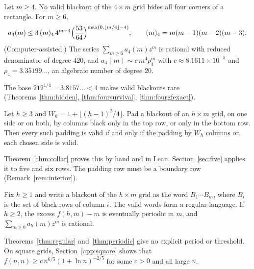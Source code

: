 \begin{introthm}\label{thm:C}
Let $m\ge4$. No valid blackout of the $4\times m$ grid hides all four corners of a
rectangle. For $m\ge6$,
\[
a_4(m)\le3\,(m)_4\,4^{m-4}\Bigl(\frac{53}{64}\Bigr)^{\max(0,\lfloor m/4\rfloor-4)},
\qquad (m)_4=m(m-1)(m-2)(m-3).
\]
(Computer-assisted.) The series $\sum_{m\ge6}a_4(m)z^m$ is rational with reduced
denominator of degree $420$, and $a_4(m)\sim c\,m^4\rho_4^m$ with $c\approx8.1611\times10^{-5}$
and $\rho_4=3.35199\ldots$, an algebraic number of degree $20$.
\end{introthm}

The base $212^{1/4}=3.8157\ldots<4$ makes valid blackouts rare (Theorems~\ref{thm:hidden},
\ref{thm:foursurvival}, \ref{thm:fourgfexact}).

\begin{introthm}\label{thm:D}
Let $h\ge3$ and $W_h=1+\lfloor(h-1)^2/4\rfloor$. Pad a blackout of an $h\times m$ grid, on
one side or on both, by columns black only in the top row, or only in the bottom row.
Then every such padding is valid if and only if the padding by $W_h$ columns on each
chosen side is valid.
\end{introthm}

Theorem~\ref{thm:collar} proves this by hand and in Lean. Section~\ref{sec:five} applies it
to five and six rows. The padding row must be a boundary row (Remark~\ref{rem:interior}).

\begin{introthm}\label{thm:E}
Fix $h\ge1$ and write a blackout of the $h\times m$ grid as the word $B_1\cdots B_m$,
where $B_i$ is the set of black rows of column $i$. The valid words form a regular
language. If $h\ge2$, the excess $f(h,m)-m$ is eventually periodic in $m$, and
$\sum_{m\ge0}a_h(m)z^m$ is rational.
\end{introthm}

Theorems~\ref{thm:regular} and~\ref{thm:periodic} give no explicit period or threshold.
On square grids, Section~\ref{app:square} shows that
$f(n,n)\ge c\,n^{6/5}(1+\ln n)^{-2/5}$ for some $c>0$ and all large $n$.

